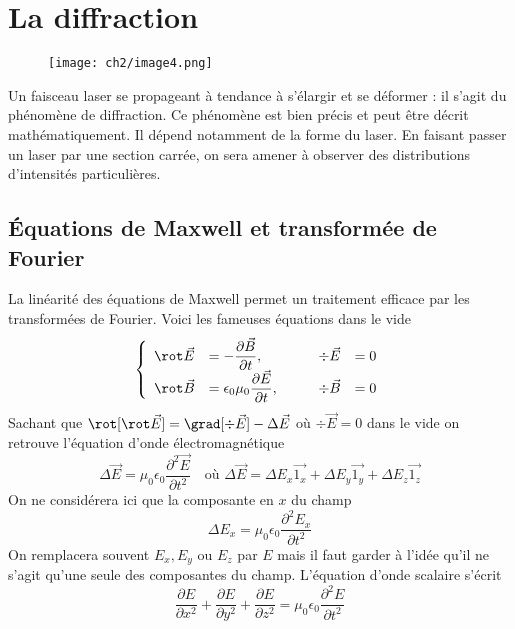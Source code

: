 \chapter{La diffraction}
\begin{wrapfigure}[8]{r}{2cm}
\vspace{-6mm}
\texttt{[image: ch2/image4.png]}
\end{wrapfigure}
Un faisceau laser se propageant à tendance à s'élargir et se déformer : il s'agit du 
phénomène de diffraction. Ce phénomène est bien précis et peut être décrit mathématiquement. 
Il dépend notamment de la forme du laser. En faisant passer un laser par une section carrée, 
on sera amener à observer des distributions d'intensités particulières.

\section{Équations de Maxwell et transformée de Fourier}
La linéarité des équations de Maxwell permet un traitement efficace par les transformées 
de Fourier. Voici les fameuses équations dans le vide
\begin{equation}
\left\{\begin{array}{llll}
\rot \vec{E} &= -\dfrac{\partial \vec{B}}{\partial t},\qquad &\div \vec{E} &= 0\\
\rot \vec{B} &= \epsilon_0\mu_0\dfrac{\partial \vec{E}}{\partial t},\qquad &\div \vec{B} &= 0
\end{array}\right.
\end{equation}
Sachant que $\rot [\rot \vec{E}] = \grad[\div \vec{E}] - \Delta\vec{E}$ où $\div \vec{E}=0$ dans 
le vide on retrouve l'équation d'onde électromagnétique
\begin{equation}
\Delta \vec{E} = \mu_0\epsilon_0\dfrac{\partial^2\vec{E}}{\partial t^2}\quad \text{où } \Delta 
\vec{E} = \Delta E_x\vec{1_x}+\Delta E_y\vec{1_y}+\Delta E_z\vec{1_z}
\end{equation}
On ne considérera ici que la composante en $x$ du champ
\begin{equation}
\Delta E_x = \mu_0\epsilon_0\dfrac{\partial^2E_x}{\partial t^2}
\end{equation}
On remplacera souvent $E_x,E_y$ ou $E_z$ par $E$ mais il faut garder à l'idée qu'il ne s'agit 
qu'une seule des composantes du champ. L'équation d'onde scalaire s'écrit
\begin{equation}
\dfrac{\partial E}{\partial x^2}+\dfrac{\partial E}{\partial y^2}+\dfrac{\partial E}{\partial z^2} 
= \mu_0\epsilon_0\dfrac{\partial^2E}{\partial t^2}
\end{equation}
